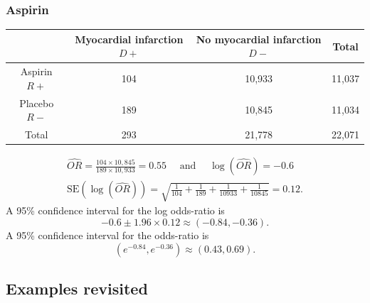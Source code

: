 \documentclass[a4paper]{article}\usepackage[]{graphicx}\usepackage[]{xcolor}
\begin{document}
\subsubsection{Aspirin}
\begin{table}[H]
	\centering
	\begin{tabular}{@{}cccc@{}}
	\toprule
		             & Myocardial infarction \( D+ \)  & No myocardial infarction \( D- \)  & Total \\ \midrule
	Aspirin \( R+ \) & 104	                           & 10,933                             & 11,037 \\
	Placebo \( R- \) & 189                             & 10,845                             & 11,034 \\
	Total            & 293                             & 21,778	                            & 22,071 \\ \bottomrule
	\end{tabular}
\end{table}
\begin{gather*}
	\widehat{OR} = \frac{104 \times 10,845}{189\times 10,933} = 0.55 \quad \text{ and } \quad \log(\widehat{OR}) = -0.6\\
	\text{SE}(\log(\widehat{OR})) = \sqrt{\frac{1}{104} + \frac{1}{189} + \frac{1}{10933} + \frac{1}{10845}} = 0.12.
\end{gather*}
A 95\% confidence interval for the log odds-ratio is
\[
	-0.6 \pm 1.96 \times 0.12 \approx (-0.84,-0.36).
\]
A 95\% confidence interval for the odds-ratio is
\[
	(e^{-0.84},e^{-0.36}) \approx (0.43,0.69).
\]
\subsection{Examples revisited}
\end{document}
